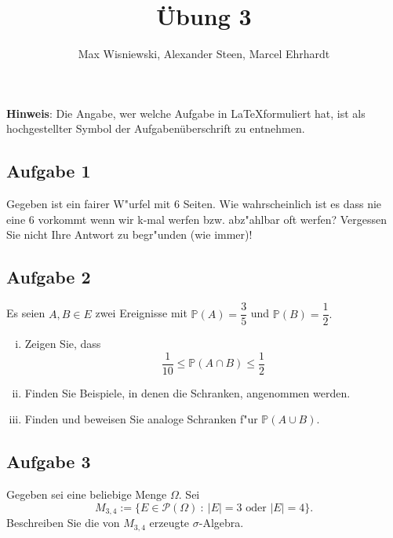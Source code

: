 \documentclass[11pt,a4paper,ngerman]{article}
\date{}
\title{Übung 3}
\author{Max Wisniewski\maxw, Alexander Steen\alex, Marcel Ehrhardt\marcel}
\newcommand{\set}[1]{ \{ #1 \}}
\newcommand{\Prob}{\mathbb{P}}
\newcommand{\Pot}{\mathcal{P}}
\newcommand{\abs}[1]{ |#1|}
\begin{document}

\renewcommand{\figurename}{Figure}

\maketitle
\thispagestyle{fancy}

\begin{center}
\textbf{Hinweis}: Die Angabe, wer welche Aufgabe in \LaTeX formuliert hat, ist als hochgestellter Symbol der Aufgabenüberschrift zu entnehmen.
\end{center}


\subsection*{Aufgabe 1}
Gegeben ist ein fairer W"urfel mit 6 Seiten. Wie wahrscheinlich ist es dass nie eine
6 vorkommt wenn wir k-mal werfen bzw. abz"ahlbar oft werfen? Vergessen Sie nicht
Ihre Antwort zu begr"unden (wie immer)!

\subsection*{Aufgabe 2}
Es seien $A, B \in E$ zwei Ereignisse mit $\Prob(A) = \dfrac{3}{5}$ und $\Prob(B) = \dfrac{1}{2}.$

\begin{enumerate}[(i)]
  \item Zeigen Sie, dass \[\dfrac{1}{10} \le \Prob(A \cap B) \le \dfrac{1}{2}\]
  \item Finden Sie Beispiele, in denen die Schranken, angenommen werden.
  \item Finden und beweisen Sie analoge Schranken f"ur $\Prob(A \cup B)$.
\end{enumerate}

\subsection*{Aufgabe 3}

\newcommand{\SetM}{M_{3,4}}

Gegeben sei eine beliebige Menge $\Omega$. Sei \[
  \SetM := \set{E \in \Pot(\Omega)\ :\ \abs{E} = 3 \mbox{ oder } \abs{E} = 4}.
\]
Beschreiben Sie die von $\SetM$ erzeugte $\sigma$-Algebra.
\end{document}
